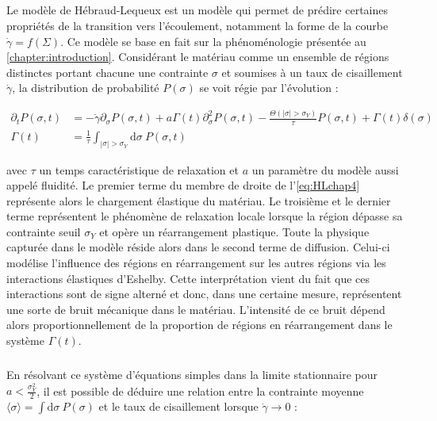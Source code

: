 
\label{sec:HL_def}

\subparagraph{}Le modèle de Hébraud-Lequeux \cite{hebraud_mode_coupling_1998} est un modèle qui permet de prédire certaines propriétés de la transition vers l'écoulement, notamment la forme de la courbe $\dot{\gamma} = f(\Sigma)$. Ce modèle se base en fait sur la phénoménologie présentée au \autoref{chapter:introduction}. Considérant le matériau comme un ensemble de régions distinctes portant chacune une contrainte $\sigma$ et soumises à un taux de cisaillement $\dot{\gamma}$, la distribution de probabilité $P(\sigma)$ se voit régie par l'évolution :

\begin{equation}
\begin{aligned}
	\partial_t P(\sigma, t) &= -\dot{\gamma}\partial_\sigma P(\sigma, t) + a\Gamma(t)\partial_\sigma^2P(\sigma, t) - \frac{\Theta (|\sigma|>\sigma_Y)}{\tau}P(\sigma, t) + \Gamma(t)\delta(\sigma)\\
	\Gamma(t) &= \frac{1}{\tau}\int_{|\sigma|>\sigma_Y}\mathrm{d}\sigma ~ P(\sigma, t)
\end{aligned}
\label{eq:HLchap4}
\end{equation}

\noindent avec $\tau$ un temps caractéristique de relaxation et $a$ un paramètre du modèle aussi appelé fluidité. Le premier terme du membre de droite de l'\autoref{eq:HLchap4} représente alors le chargement élastique du matériau. Le troisième et le dernier terme représentent le phénomène de relaxation locale lorsque la région dépasse sa contrainte seuil $\sigma_Y$ et opère un réarrangement plastique. Toute la physique capturée dans le modèle réside alors dans le second terme de diffusion. Celui-ci modélise l'influence des régions en réarrangement sur les autres régions via les interactions élastiques d'Eshelby. Cette interprétation vient du fait que ces interactions sont de signe alterné et donc, dans une certaine mesure, représentent une sorte de bruit mécanique dans le matériau. L'intensité de ce bruit dépend alors proportionnellement de la proportion de régions en réarrangement dans le système $\Gamma (t)$.

\subparagraph{}En résolvant ce système d'équations simples dans la limite stationnaire pour $a < \frac{\sigma_Y^2}{2}$, il est possible de déduire une relation entre la contrainte moyenne $\langle \sigma \rangle =  \int \mathrm{d}\sigma ~ P(\sigma)$ et le taux de cisaillement lorsque $\dot{\gamma}\rightarrow 0$ \cite{olivier_fluides_2011, bertin_stochastic_2022} :

